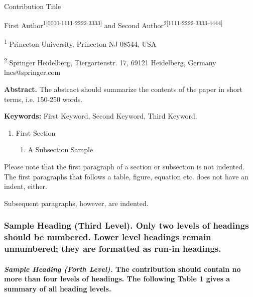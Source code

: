 
Contribution Title

First Author\textsuperscript{1{[}0000-1111-2222-3333{]}} and Second
Author\textsuperscript{2{[}1111-2222-3333-4444{]}}

\textsuperscript{1} Princeton University, Princeton NJ 08544, USA

\textsuperscript{2} Springer Heidelberg, Tiergartenstr. 17, 69121
Heidelberg, Germany\\
lncs@springer.com

\textbf{Abstract.} The abstract should summarize the contents of the
paper in short terms, i.e. 150-250 words.

\textbf{Keywords:} First Keyword, Second Keyword, Third Keyword.

\begin{enumerate}
\def\labelenumi{\arabic{enumi}.}
\item
  First Section

  \begin{enumerate}
  \def\labelenumii{\arabic{enumii}.}
  \item
    A Subsection Sample
  \end{enumerate}
\end{enumerate}

Please note that the first paragraph of a section or subsection is not
indented. The first paragraphs that follows a table, figure, equation
etc. does not have an indent, either.

Subsequent paragraphs, however, are indented.

\hypertarget{sample-heading-third-level.-only-two-levels-of-headings-should-be-numbered.-lower-level-headings-remain-unnumbered-they-are-formatted-as-run-in-headings.}{%
\subsubsection{\texorpdfstring{\textbf{Sample Heading (Third Level).}
Only two levels of headings should be numbered. Lower level headings
remain unnumbered; they are formatted as run-in
headings.}{Sample Heading (Third Level). Only two levels of headings should be numbered. Lower level headings remain unnumbered; they are formatted as run-in headings.}}\label{sample-heading-third-level.-only-two-levels-of-headings-should-be-numbered.-lower-level-headings-remain-unnumbered-they-are-formatted-as-run-in-headings.}}

\hypertarget{sample-heading-forth-level.-the-contribution-should-contain-no-more-than-four-levels-of-headings.-the-following-table-1-gives-a-summary-of-all-heading-levels.}{%
\paragraph{\texorpdfstring{\emph{Sample Heading (Forth Level).} The
contribution should contain no more than four levels of headings. The
following Table 1 gives a summary of all heading
levels.}{Sample Heading (Forth Level). The contribution should contain no more than four levels of headings. The following Table 1 gives a summary of all heading levels.}}\label{sample-heading-forth-level.-the-contribution-should-contain-no-more-than-four-levels-of-headings.-the-following-table-1-gives-a-summary-of-all-heading-levels.}}

